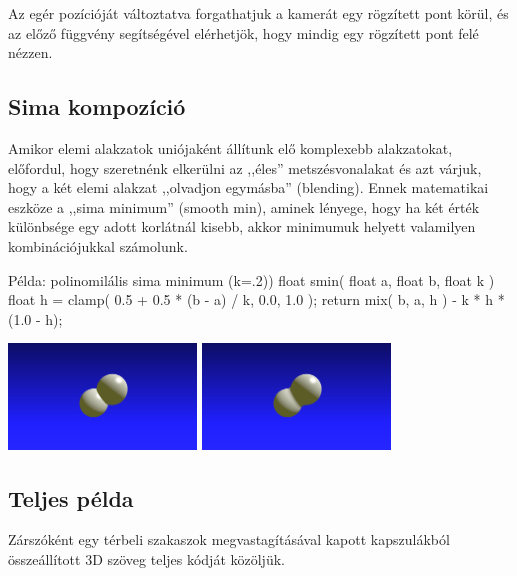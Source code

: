 
Az egér pozícióját változtatva forgathatjuk a kamerát egy rögzített pont körül,
és az előző függvény segítségével elérhetjök, hogy mindig egy rögzített pont felé nézzen.


\subsection{Sima kompozíció}

Amikor elemi alakzatok uniójaként állítunk elő komplexebb alakzatokat, előfordul, hogy
szeretnénk elkerülni az ,,éles'' metszésvonalakat és azt várjuk, hogy a két elemi alakzat
,,olvadjon egymásba'' (blending). Ennek matematikai eszköze a ,,sima minimum'' (smooth min),
aminek lényege, hogy ha két érték különbsége egy adott korlátnál kisebb, akkor minimumuk helyett
valamilyen kombinációjukkal számolunk.

\begin{glsl}{Példa: polinomilális sima minimum (k=.2))}
float smin( float a, float b, float k )
{
  float h = clamp( 0.5 + 0.5 * (b - a) / k, 0.0, 1.0 );
  return mix( b, a, h ) - k * h * (1.0 - h);
}
\end{glsl}


\begin{center}
  \hfill
  \includegraphics[width=5cm]{images/uni-min.png}\hfill
  \includegraphics[width=5cm]{images/uni-smin.png}\hfill~
  \end{center}

\subsection{Teljes példa}

Zárszóként egy térbeli szakaszok megvastagításával kapott kapszulákból
összeállított 3D szöveg teljes kódját közöljük.



